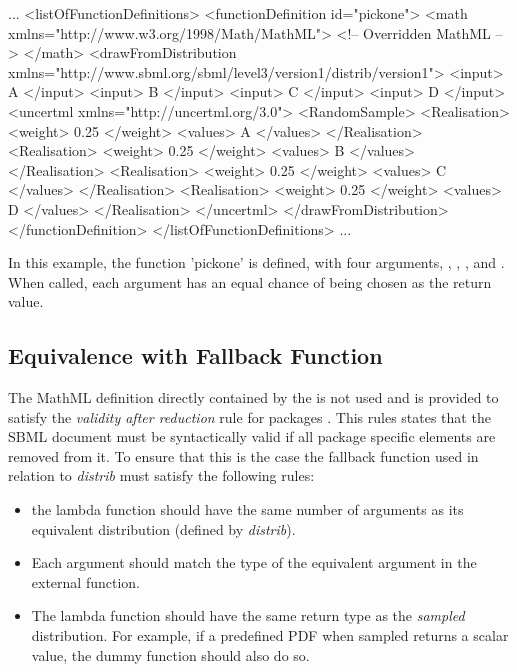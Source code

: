 \documentclass[draftspec]{sbmlpkgspec}
\newcommand{\distribshort}{\emph{distrib}\xspace}
\newcommand{\mathml}{MathML\xspace}
\begin{document}
\begin{example}
...
  <listOfFunctionDefinitions>
    <functionDefinition id="pickone">
      <math xmlns="http://www.w3.org/1998/Math/MathML">
        <!-- Overridden MathML -->
      </math>
      <drawFromDistribution xmlns="http://www.sbml.org/sbml/level3/version1/distrib/version1">
         <input> A </input>
         <input> B </input>
         <input> C </input>
         <input> D </input>
         <uncertml xmlns="http://uncertml.org/3.0">
           <RandomSample>
             <Realisation>
               <weight> 0.25 </weight>
               <values> A </values>
             </Realisation>
             <Realisation>
               <weight> 0.25 </weight>
               <values> B </values>
             </Realisation>
             <Realisation>
               <weight> 0.25 </weight>
               <values> C </values>
             </Realisation>
             <Realisation>
               <weight> 0.25 </weight>
               <values> D </values>
             </Realisation>
         </uncertml>
      </drawFromDistribution>
    </functionDefinition>
  </listOfFunctionDefinitions>
...
\end{example}

In this example, the function 'pickone' is defined, with four arguments, , , , and .  When called, each argument has an equal chance of being chosen as the return value.


\subsection{Equivalence with Fallback Function}
\label{sec:fallbackfunc}

The \mathml definition directly contained by the
 is not used and is provided to
satisfy the \emph{validity after reduction} rule for packages
\cite{sbmll3v1packrule}. This rules states that the SBML document must
be syntactically valid if all package specific elements are removed
from it. To ensure that this is the case the fallback function used in
relation to \distribshort must satisfy the following rules:

\begin{itemize}
\item the lambda function should have the same number of arguments as
  its equivalent distribution (defined by \distribshort).
\item Each argument should match the type of the equivalent argument
  in the external function.
\item The lambda function should have the same return type as the
  \emph{sampled} distribution. For example, if a predefined PDF when
  sampled returns a scalar value, the dummy function should also do so.
\end{itemize}
\end{document}
